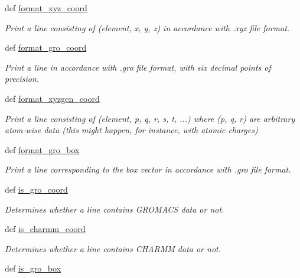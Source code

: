 \begin{DoxyCompactItemize}
def \hyperlink{namespaceforcebalance_1_1molecule_a2eba3cad44138b3b10ea883240888412}{format\-\_\-xyz\-\_\-coord}
\begin{DoxyCompactList}\small\item\em \-Print a line consisting of (element, x, y, z) in accordance with .xyz file format. \end{DoxyCompactList}\item 
def \hyperlink{namespaceforcebalance_1_1molecule_a41c13064e4285973aa6c49369d3d3390}{format\-\_\-gro\-\_\-coord}
\begin{DoxyCompactList}\small\item\em \-Print a line in accordance with .gro file format, with six decimal points of precision. \end{DoxyCompactList}\item 
def \hyperlink{namespaceforcebalance_1_1molecule_a4948e4662b8d2c8d515427d1bbb3d01e}{format\-\_\-xyzgen\-\_\-coord}
\begin{DoxyCompactList}\small\item\em \-Print a line consisting of (element, p, q, r, s, t, ...) where (p, q, r) are arbitrary atom-\/wise data (this might happen, for instance, with atomic charges) \end{DoxyCompactList}\item 
def \hyperlink{namespaceforcebalance_1_1molecule_ae25aa5331b3a2dd0e9d1e184380357db}{format\-\_\-gro\-\_\-box}
\begin{DoxyCompactList}\small\item\em \-Print a line corresponding to the box vector in accordance with .gro file format. \end{DoxyCompactList}\item 
def \hyperlink{namespaceforcebalance_1_1molecule_a12b7bb398c2fa49a223f258ec7737483}{is\-\_\-gro\-\_\-coord}
\begin{DoxyCompactList}\small\item\em \-Determines whether a line contains \-G\-R\-O\-M\-A\-C\-S data or not. \end{DoxyCompactList}\item 
def \hyperlink{namespaceforcebalance_1_1molecule_a838d85848bd817e801d0f5f6502217ef}{is\-\_\-charmm\-\_\-coord}
\begin{DoxyCompactList}\small\item\em \-Determines whether a line contains \-C\-H\-A\-R\-M\-M data or not. \end{DoxyCompactList}\item 
def \hyperlink{namespaceforcebalance_1_1molecule_aafc8c924eed4480fed8ddc9c474d3bc1}{is\-\_\-gro\-\_\-box}

\end{DoxyCompactItemize}
